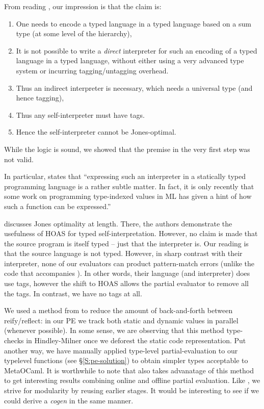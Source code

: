 \documentclass[preprint]{sigplanconf}
\begin{document}
From reading \citet{WalidICFP02,taha-tag,xi-guarded,peyton-jones-simple}, our 
impression is that the claim is:
\begin{enumerate}
\item One needs to encode a typed language in a typed language based on
a sum type (at some level of the hierarchy),
\item It is not possible to write a \emph{direct} interpreter 
for such an encoding of a typed language
in a typed language, without either using a
very advanced type system or incurring tagging/untagging overhead.
\item Thus an indirect interpreter is necessary, which needs a universal
  type (and hence tagging),
\item Thus any self-interpreter must have tags.
\item Hence the self-interpreter cannot be Jones-optimal.
\end{enumerate}
While the logic is sound, we showed that the premise in the very first step
was not valid.

In particular, \citet[\S5]{taha-tag}
states that ``expressing such an interpreter in a statically typed
programming language is a rather subtle matter. In fact, it is only
recently that some work on programming type-indexed values in ML
\citep{yang-encoding} has given a hint of how such a function can be
expressed.''  

\citet{Danvy-tagging-encoding} discusses Jones optimality at length.
There, the authors demonstrate the usefulness of HOAS for typed
self-interpretation.  However, no claim is made that the source program
is itself typed -- just that the interpreter is.  Our reading is that
the source language is not typed.  However, in sharp contrast with 
their interpreter, none of our evaluators can product pattern-match errors
(unlike the code that accompanies \citet{Danvy-tagging-encoding}).
In other words, their language (and interpreter) does use tags, however
the shift to HOAS allows the partial evaluator to remove all the tags.
In contrast, we have no tags at all.

We used a method from \citet{Asai-SAS99} to reduce the amount
of back-and-forth between reify/reflect: in our PE we track both
static and dynamic values in parallel (whenever possible).  In some sense,
we are observing that this method type-checks in Hindley-Milner once we
deforest the static code representation.  Put another way, we have
manually applied type-level partial-evaluation to our typelevel 
functions (see \S\ref{S:pe-solution}) to obtain simpler types 
acceptable to MetaOCaml.  It is worthwhile to note that 
\citet{Sumii-HOSC2001} also takes advanatage of this method
\citep[of][]{Asai-SAS99} to get interesting results combining online
and offline partial evaluation.  Like \citet{SperberThiemann:TwoForOne},
we strive for modularity by reusing earlier stages.  It would be interesting
to see if we could derive a \emph{cogen} \citep{Thiemann:cogeninsixlines}
in the same manner.
\end{document}

